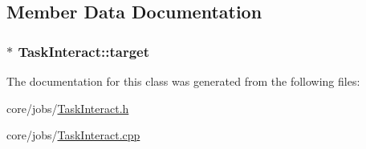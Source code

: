 \subsection{Member Data Documentation}
\hypertarget{classTaskInteract_ab84e9122334cfd0e1a32eac3bbba2e2d}{
\subsubsection[{target}]{$\ast$ Task\-Interact\-::target}}\label{classTaskInteract_ab84e9122334cfd0e1a32eac3bbba2e2d}


The documentation for this class was generated from the following files\-:\begin{DoxyCompactItemize}
\item 
core/jobs/\hyperlink{TaskInteract_8h}{Task\-Interact.\-h}\item 
core/jobs/\hyperlink{TaskInteract_8cpp}{Task\-Interact.\-cpp}\end{DoxyCompactItemize}
